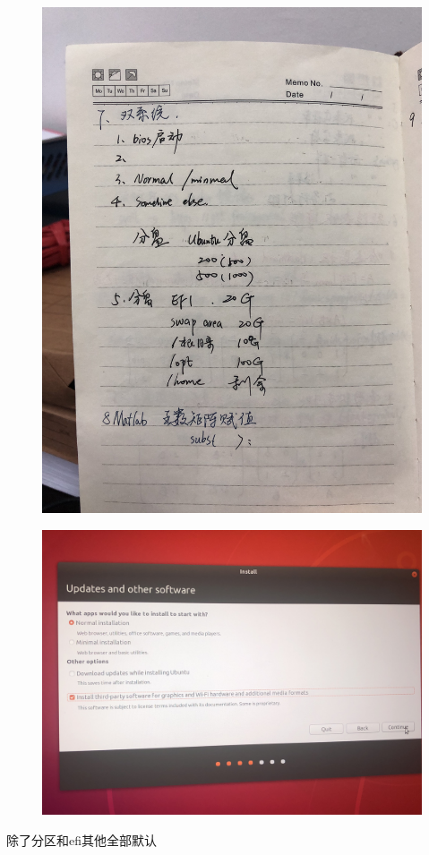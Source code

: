 \documentclass[12pt,a4paper]{article}
\begin{document}
	\begin{figure}[H]
		\centering
		\includegraphics[width=0.7\linewidth]{figures/IMG_2799}
		\caption{}
		\label{fig:img2799}
	\end{figure}
	\begin{figure}[H]
		\centering
		\includegraphics[width=0.7\linewidth]{figures/IMG_2809}
		\caption{}
		\label{fig:img2809}	
	\end{figure}
	除了分区和efi其他全部默认
\end{document}
